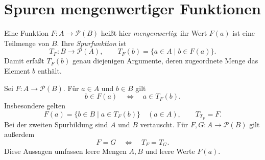 \section{Spuren mengenwertiger Funktionen}

\begin{definition}
Eine Funktion $F\colon A\to\mathcal P(B)$ heißt hier
\emph{mengenwertig}; ihr Wert $F(a)$ ist eine Teilmenge von $B$.
Ihre \emph{Spurfunktion} ist
\[
 T_F\colon B\to\mathcal P(A),\qquad
 T_F(b)=\{a\in A\mid b\in F(a)\}.
\]
Damit erfaßt $T_F(b)$ genau diejenigen Argumente, deren
zugeordnete Menge das Element $b$ enthält.
\end{definition}

\begin{theorem}
\label{b05guide:thm:traces}
Sei $F\colon A\to\mathcal P(B)$. Für $a\in A$ und $b\in B$ gilt
\[
 b\in F(a)\quad\Longleftrightarrow\quad a\in T_F(b).
\]
Insbesondere gelten
\[
 F(a)=\{b\in B\mid a\in T_F(b)\}\quad(a\in A),
 \qquad T_{T_F}=F.
\]
Bei der zweiten Spurbildung sind $A$ und $B$ vertauscht.
Für $F,G\colon A\to\mathcal P(B)$ gilt außerdem
\[
 F=G\quad\Longleftrightarrow\quad T_F=T_G.
\]
Diese Aussagen umfassen leere Mengen $A,B$ und leere Werte $F(a)$.
\end{theorem}
